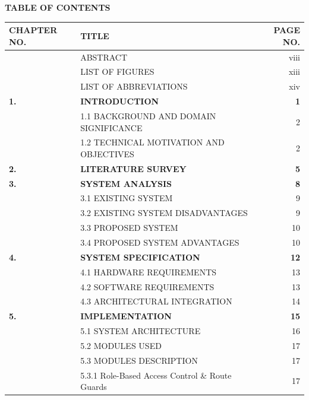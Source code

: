 \begin{center}
  {\fontsize{16pt}{20pt}\selectfont\bfseries TABLE OF CONTENTS\par}
\end{center}
\vspace{0.4cm}

\begin{table}[H]
  \centering
  \fontsize{12.5pt}{17.5pt}\selectfont
  \begin{tabularx}{\textwidth}{@{}p{3.2cm} L r@{}}
    \textbf{CHAPTER NO.} & \textbf{TITLE} & \textbf{PAGE NO.} \\
    \midrule
     & ABSTRACT & viii \\
     & LIST OF FIGURES & xiii \\
     & LIST OF ABBREVIATIONS & xiv \\
    \textbf{1.} & \textbf{INTRODUCTION} & \textbf{1} \\
     & 1.1 BACKGROUND AND DOMAIN SIGNIFICANCE & 2 \\
     & 1.2 TECHNICAL MOTIVATION AND OBJECTIVES & 2 \\
    \textbf{2.} & \textbf{LITERATURE SURVEY} & \textbf{5} \\
    \textbf{3.} & \textbf{SYSTEM ANALYSIS} & \textbf{8} \\
     & 3.1 EXISTING SYSTEM & 9 \\
     & 3.2 EXISTING SYSTEM DISADVANTAGES & 9 \\
     & 3.3 PROPOSED SYSTEM & 10 \\
     & 3.4 PROPOSED SYSTEM ADVANTAGES & 10 \\
    \textbf{4.} & \textbf{SYSTEM SPECIFICATION} & \textbf{12} \\
     & 4.1 HARDWARE REQUIREMENTS & 13 \\
     & 4.2 SOFTWARE REQUIREMENTS & 13 \\
     & 4.3 ARCHITECTURAL INTEGRATION & 14 \\
    \textbf{5.} & \textbf{IMPLEMENTATION} & \textbf{15} \\
     & 5.1 SYSTEM ARCHITECTURE & 16 \\
     & 5.2 MODULES USED & 17 \\
     & 5.3 MODULES DESCRIPTION & 17 \\
     & 5.3.1 Role-Based Access Control \& Route Guards & 17 \\
    \bottomrule
  \end{tabularx}
\end{table}
\newpage

